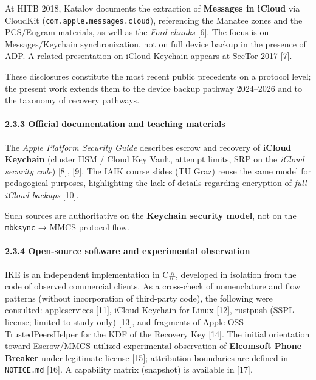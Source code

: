 \documentclass[
  english,
  10pt]{article}
\begin{document}
At HITB 2018, Katalov documents the extraction of \textbf{Messages in
iCloud} via CloudKit (\texttt{com.apple.messages.cloud}), referencing
the Manatee zones and the PCS/Engram materials, as well as the
\emph{Ford chunks} {[}6{]}. The focus is on Messages/Keychain
synchronization, not on full device backup in the presence of ADP. A
related presentation on iCloud Keychain appears at SecTor 2017 {[}7{]}.

These disclosures constitute the most recent public precedents on a
protocol level; the present work extends them to the device backup
pathway 2024--2026 and to the taxonomy of recovery pathways.

\paragraph{2.3.3 Official documentation and teaching
materials}\label{official-documentation-and-teaching-materials}

The \emph{Apple Platform Security Guide} describes escrow and recovery
of \textbf{iCloud Keychain} (cluster HSM / Cloud Key Vault, attempt
limits, SRP on the \emph{iCloud security code}) {[}8{]}, {[}9{]}. The
IAIK course slides (TU Graz) reuse the same model for pedagogical
purposes, highlighting the lack of details regarding encryption of
\emph{full iCloud backups} {[}10{]}.

Such sources are authoritative on the \textbf{Keychain security model},
not on the \texttt{mbksync} → MMCS protocol flow.

\paragraph{2.3.4 Open-source software and experimental
observation}\label{open-source-software-and-experimental-observation}

IKE is an independent implementation in C\#, developed in isolation from
the code of observed commercial clients. As a cross-check of
nomenclature and flow patterns (without incorporation of third-party
code), the following were consulted: appleservices {[}11{]},
iCloud-Keychain-for-Linux {[}12{]}, rustpush (SSPL license; limited to
study only) {[}13{]}, and fragments of Apple OSS TrustedPeersHelper for
the KDF of the Recovery Key {[}14{]}. The initial orientation toward
Escrow/MMCS utilized experimental observation of \textbf{Elcomsoft Phone
Breaker} under legitimate license {[}15{]}; attribution boundaries are
defined in \texttt{NOTICE.md} {[}16{]}. A capability matrix (snapshot)
is available in {[}17{]}.
\end{document}
